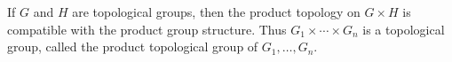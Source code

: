If $G$ and $H$ are topological groups, then the product topology on $G \times H$ is compatible with the product group structure. Thus $G_1 \times \cdots \times G_n$ is a topological group, called the product topological group of $G_1, \ldots, G_n$.
